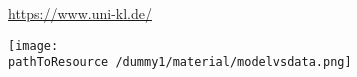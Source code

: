 
\url{https://www.uni-kl.de/}

\texttt{[image: \\pathToResource /dummy1/material/modelvsdata.png]}


